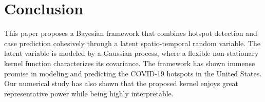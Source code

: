 \documentclass[journal]{IEEEtran}
\begin{document}
\section{Conclusion}
This paper proposes a Bayesian framework that combines hotspot detection and case prediction cohesively through a latent spatio-temporal random variable.
The latent variable is modeled by a Gaussian process, where a flexible non-stationary kernel function characterizes its covariance. 
The framework has shown immense promise in modeling and predicting the COVID-19 hotspots in the United States.
Our numerical study has also shown that the proposed kernel enjoys great representative power while being highly interpretable. 


%



\end{document}
